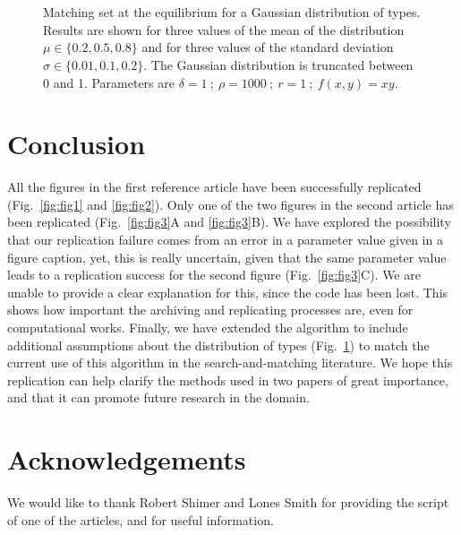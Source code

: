 \begin{figure}[!ht]
	\centering
	\quad
	\quad
	\quad
	\\
	\quad
	\quad
	\quad
	\\
	\quad
	\quad
	\quad
	\caption{Matching set at the equilibrium for a Gaussian distribution of types. Results are shown for three values of the mean of the distribution $\mu \in \{0.2,0.5,0.8\}$ and for three values of the standard deviation $\sigma \in \{0.01,0.1,0.2\}$. The Gaussian distribution is truncated between 0 and 1. Parameters are $\delta=1 \ ; \ \rho=1000 \ ; \ r=1 \ ; \ f(x,y)=xy$.}
	\label{fig:fig4}
\end{figure}




\section*{Conclusion}
All the figures in the first reference article \citep{shimer_assortative_2000} have been successfully replicated (Fig.~\ref{fig:fig1} and \ref{fig:fig2}). Only one of the two figures in the second article \citep{smith_marriage_2006} has been replicated (Fig.~\ref{fig:fig3}A and \ref{fig:fig3}B). We have explored the possibility that our replication failure comes from an error in a parameter value given in a figure caption, yet, this is really uncertain, given that the same parameter value leads to a replication success for the second figure (Fig.~\ref{fig:fig3}C). We are unable to provide a clear explanation for this, since the code has been lost. This shows how important the archiving and replicating processes are, even for computational works. Finally, we have extended the algorithm to include additional assumptions about the distribution of types (Fig.~\ref{fig:fig4}) to match the current use of this algorithm in the search-and-matching literature. We hope this replication can help clarify the methods used in two papers of great importance, and that it can promote future research in the domain.


\section*{Acknowledgements}
We would like to thank Robert Shimer and Lones Smith for providing the script of one of the articles, and for useful information.
